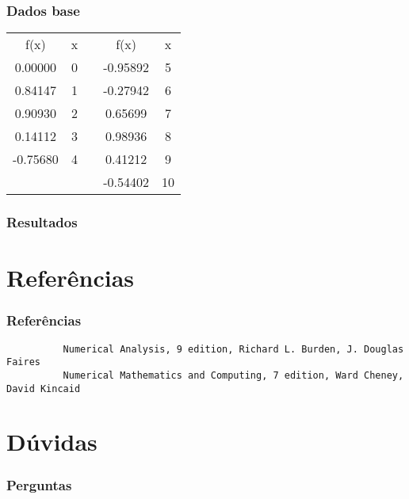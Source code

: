 \documentclass{beamer}
\begin{document}
\begin{frame}[fragile]
  \frametitle{Dados base}
\begin{table}[]
  \begin{tabular}{|c|c|l|c|c|}
  \cline{1-2} \cline{4-5}
  f(x)                   & x &  & f(x)                          & x                       \\ \cline{1-2} \cline{4-5} 
  0.00000                & 0 &  & -0.95892                      & 5                       \\ \cline{1-2} \cline{4-5} 
  0.84147                & 1 &  & -0.27942                      & 6                       \\ \cline{1-2} \cline{4-5} 
  0.90930                & 2 &  & 0.65699                       & 7                       \\ \cline{1-2} \cline{4-5} 
  0.14112                & 3 &  & 0.98936                       & 8                       \\ \cline{1-2} \cline{4-5} 
  -0.75680               & 4 &  & 0.41212                       & 9                       \\ \cline{1-2} \cline{4-5} 
  \multicolumn{1}{|l|}{} &   &  & \multicolumn{1}{l|}{-0.54402} & \multicolumn{1}{l|}{10} \\ \cline{1-2} \cline{4-5} 
  \end{tabular}
  \end{table}

  \end{frame}

\begin{frame}[fragile]
    \frametitle{Resultados}
    \begin{center}
  \end{center}
\end{frame}

\section{Referências}
\begin{frame}[fragile]
    \frametitle{Referências}
    \begin{footnotesize}
        \begin{verbatim}
          Numerical Analysis, 9 edition, Richard L. Burden, J. Douglas Faires
          Numerical Mathematics and Computing, 7 edition, Ward Cheney, David Kincaid
        \end{verbatim}
    \end{footnotesize}
\end{frame}
    
    
\section{Dúvidas}
\begin{frame}[fragile]
    \frametitle{Perguntas}
        \begin{center}
        \end{center}

\end{frame}
    
\end{document}
